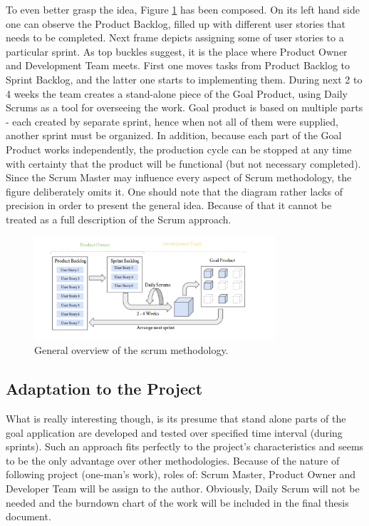 \documentclass{report}
\begin{document}
To even better grasp the idea, Figure \ref{fig:scrum_diag} has been composed. On its left hand side one can observe the Product Backlog, filled up with different user stories that needs to be completed. Next frame depicts assigning some of user stories to a particular sprint. As top buckles suggest, it is the place where Product Owner and Development Team meets. First one moves tasks from Product Backlog to Sprint Backlog, and the latter one starts to implementing them. During next 2 to 4 weeks the team creates a stand-alone piece of the Goal Product, using Daily Scrums as a tool for overseeing the work. Goal product is based on multiple parts - each created by separate sprint, hence when not all of them were supplied, another sprint must be organized. In addition, because each part of the Goal Product works independently, the production cycle can be stopped at any time with certainty that the product will be functional (but not necessary completed). Since the Scrum Master may influence every aspect of Scrum methodology, the figure deliberately omits it. One should note that the diagram rather lacks of precision in order to present the general idea. Because of that it cannot be treated as a full description of the Scrum approach.

\begin{figure}[H]
    \centering
    \includegraphics[width=0.8\textwidth]{images/scrum_diag.pdf}
    \caption{General overview of the scrum methodology.}
    \label{fig:scrum_diag}
\end{figure}

\subsection{Adaptation to the Project}

What is really interesting  though, is its presume that stand alone parts of the goal application  are developed and tested over specified time interval (during sprints). Such an approach fits perfectly to the project's characteristics and seems to be the only advantage over other methodologies. Because of the nature of following project (one-man's work), roles of: Scrum Master, Product Owner and Developer Team will be assign to the author. Obviously, Daily Scrum will not be needed and the burndown chart of the work will be included in the final thesis document.
\end{document}
